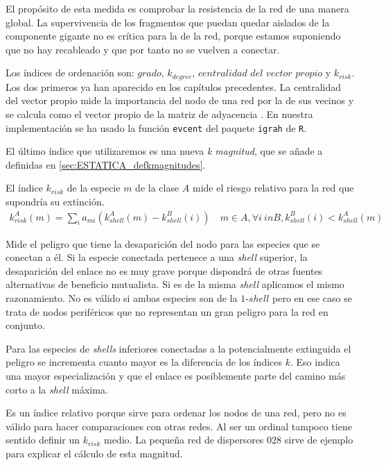 El propósito de esta medida es comprobar la resistencia de la red de una manera global. La supervivencia de los fragmentos que puedan quedar aislados de la componente gigante no es crítica para la de la red, porque estamos suponiendo que no hay recableado y que por tanto no se vuelven a conectar.

Los índices de ordenación son: $grado$, ${k}_{degree}$, $centralidad$ $del$ $vector$ $propio$ y ${k}_{risk}$. Los dos primeros ya han aparecido en los capítulos precedentes. La centralidad del vector propio mide la importancia del nodo de una red por la de sus vecinos y se calcula como el vector propio de la matriz de adyacencia \cite{newman2008mathematics}. En nuestra implementación se ha usado la función \texttt{evcent} del paquete \texttt{igrah} de \texttt{R}.

El último índice que utilizaremos es una nueva \textit{k magnitud}, que se añade a definidas en \ref{sec:ESTATICA_defkmagnitudes}. 

\begin{theo} 
El índice \textit{$k_{risk}$} de la especie $m$ de la clase $A$ mide el riesgo relativo para la red que supondría su extinción.
\begin{align*}
k^A_{risk}\left(m\right) = \sum\limits_{i} a_{mi} \left(k^A_{shell}\left(m\right) - k^B_{shell}\left(i\right)\right)\quad   m \in A, \forall i\: in B, k^B_{shell}\left(i\right) < k^A_{shell}\left(m\right)
\end{align*}
\label{krisk}
\end{theo}

Mide el peligro que tiene la desaparición del nodo para las especies que se conectan a él. Si la especie conectada pertenece a una \textit{shell} superior, la desaparición del enlace no es muy grave porque dispondrá de otras fuentes alternativas de beneficio mutualista. Si es de la misma \textit{shell} aplicamos el mismo razonamiento. No es válido si ambas especies son de la $1$-$shell$ pero en ese caso se trata de nodos periféricos que no representan un gran peligro para la red en conjunto.

Para las especies de \textit{shells} inferiores conectadas a la potencialmente extinguida el peligro se incrementa cuanto mayor es la diferencia de los índices $k$. Eso indica una mayor especialización y que el enlace es posiblemente parte del camino más corto a la \textit{shell} máxima.

Es un índice relativo porque sirve para ordenar los nodos de una red, pero no es válido para hacer comparaciones con otras redes. Al ser un ordinal tampoco tiene sentido definir un $k_{risk}$ medio. La pequeña red de dispersores $028$ sirve de ejemplo para explicar el cálculo de esta magnitud.

